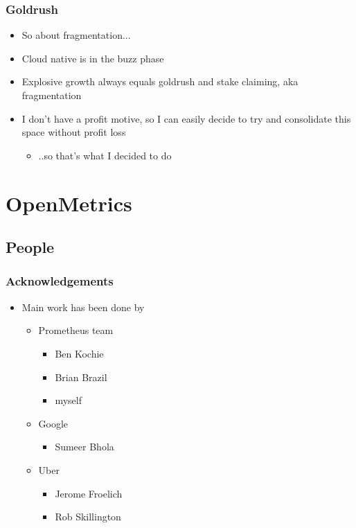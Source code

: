 \documentclass[aspectratio=169]{beamer}
\begin{document}
\begin{frame}
	\frametitle{Goldrush}
	\vfill
	\begin{itemize}
		\item So about fragmentation...
		\item Cloud native is in the buzz phase
		\item Explosive growth always equals goldrush and stake claiming, aka fragmentation
		\item I don't have a profit motive, so I can easily decide to try and consolidate this space without profit loss
		\begin{itemize}
			\item ..so that's what I decided to do
		\end{itemize}
	\end{itemize}
	\vfill
\end{frame}



\section{OpenMetrics}


\subsection{People}

\begin{frame}
	\frametitle{Acknowledgements}
	\vfill
	\begin{itemize}
		\item Main work has been done by
		\begin{itemize}
			\item Prometheus team
			\begin{itemize}
				\item Ben Kochie
				\item Brian Brazil
				\item myself
			\end{itemize}
			\item Google
			\begin{itemize}
				\item Sumeer Bhola
			\end{itemize}
			\item Uber
			\begin{itemize}
				\item Jerome Froelich
				\item Rob Skillington
			\end{itemize}
		\end{itemize}
	\end{itemize}
	\vfill
\end{frame}
\end{document}
